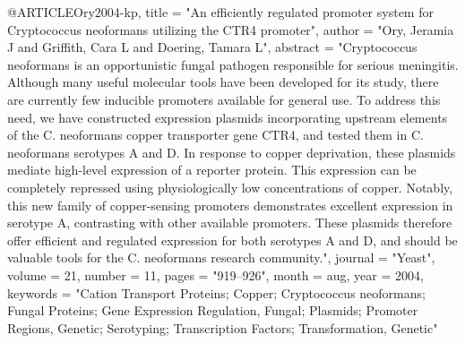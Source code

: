 @ARTICLE{Ory2004-kp,
  title    = "An efficiently regulated promoter system for Cryptococcus
              neoformans utilizing the {CTR4} promoter",
  author   = "Ory, Jeramia J and Griffith, Cara L and Doering, Tamara L",
  abstract = "Cryptococcus neoformans is an opportunistic fungal pathogen
              responsible for serious meningitis. Although many useful
              molecular tools have been developed for its study, there are
              currently few inducible promoters available for general use. To
              address this need, we have constructed expression plasmids
              incorporating upstream elements of the C. neoformans copper
              transporter gene CTR4, and tested them in C. neoformans serotypes
              A and D. In response to copper deprivation, these plasmids
              mediate high-level expression of a reporter protein. This
              expression can be completely repressed using physiologically low
              concentrations of copper. Notably, this new family of
              copper-sensing promoters demonstrates excellent expression in
              serotype A, contrasting with other available promoters. These
              plasmids therefore offer efficient and regulated expression for
              both serotypes A and D, and should be valuable tools for the C.
              neoformans research community.",
  journal  = "Yeast",
  volume   =  21,
  number   =  11,
  pages    = "919--926",
  month    =  aug,
  year     =  2004,
  keywords = "Cation Transport Proteins; Copper; Cryptococcus neoformans;
              Fungal Proteins; Gene Expression Regulation, Fungal; Plasmids;
              Promoter Regions, Genetic; Serotyping; Transcription Factors;
              Transformation, Genetic"
}

